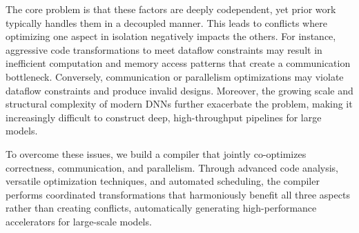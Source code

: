 \documentclass[conference]{IEEEtran}
\begin{document}
The core problem is that these factors are deeply codependent, yet prior work typically handles them in a decoupled manner. This leads to conflicts where optimizing one aspect in isolation negatively impacts the others. For instance, aggressive code transformations to meet dataflow constraints may result in inefficient computation and memory access patterns that create a communication bottleneck. Conversely, communication or parallelism optimizations may violate dataflow constraints and produce invalid designs.
Moreover, the growing scale and structural complexity of modern DNNs further exacerbate the problem, making it increasingly difficult to construct deep, high-throughput pipelines for large models. 

To overcome these issues, we build a compiler that jointly co-optimizes correctness, communication, and parallelism. Through advanced code analysis, versatile optimization techniques, and automated scheduling, the compiler performs coordinated transformations that harmoniously benefit all three aspects rather than creating conflicts, automatically generating high-performance accelerators for large-scale models.






\end{document}
